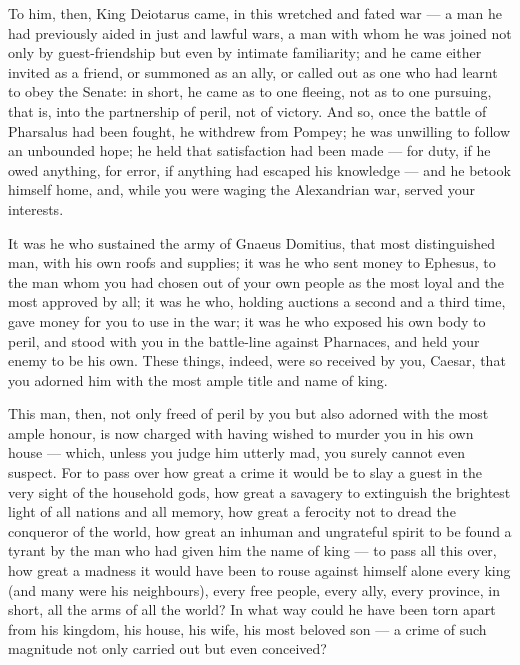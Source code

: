  To him, then, King Deiotarus came, in this wretched and fated war --- a man he had previously aided in just and lawful wars, a man with whom he was joined not only by guest-friendship but even by intimate familiarity; and he came either invited as a friend, or summoned as an ally, or called out as one who had learnt to obey the Senate: in short, he came as to one fleeing, not as to one pursuing, that is, into the partnership of peril, not of victory. And so, once the battle of Pharsalus had been fought, he withdrew from Pompey; he was unwilling to follow an unbounded hope; he held that satisfaction had been made --- for duty, if he owed anything, for error, if anything had escaped his knowledge --- and he betook himself home, and, while you were waging the Alexandrian war, served your interests.

 It was he who sustained the army of Gnaeus Domitius, that most distinguished man, with his own roofs and supplies; it was he who sent money to Ephesus, to the man whom you had chosen out of your own people as the most loyal and the most approved by all; it was he who, holding auctions a second and a third time, gave money for you to use in the war; it was he who exposed his own body to peril, and stood with you in the battle-line against Pharnaces, and held your enemy to be his own. These things, indeed, were so received by you, Caesar, that you adorned him with the most ample title and name of king.

 This man, then, not only freed of peril by you but also adorned with the most ample honour, is now charged with having wished to murder you in his own house --- which, unless you judge him utterly mad, you surely cannot even suspect. For to pass over how great a crime it would be to slay a guest in the very sight of the household gods, how great a savagery to extinguish the brightest light of all nations and all memory, how great a ferocity not to dread the conqueror of the world, how great an inhuman and ungrateful spirit to be found a tyrant by the man who had given him the name of king --- to pass all this over, how great a madness it would have been to rouse against himself alone every king (and many were his neighbours), every free people, every ally, every province, in short, all the arms of all the world? In what way could he have been torn apart from his kingdom, his house, his wife, his most beloved son --- a crime of such magnitude not only carried out but even conceived?

